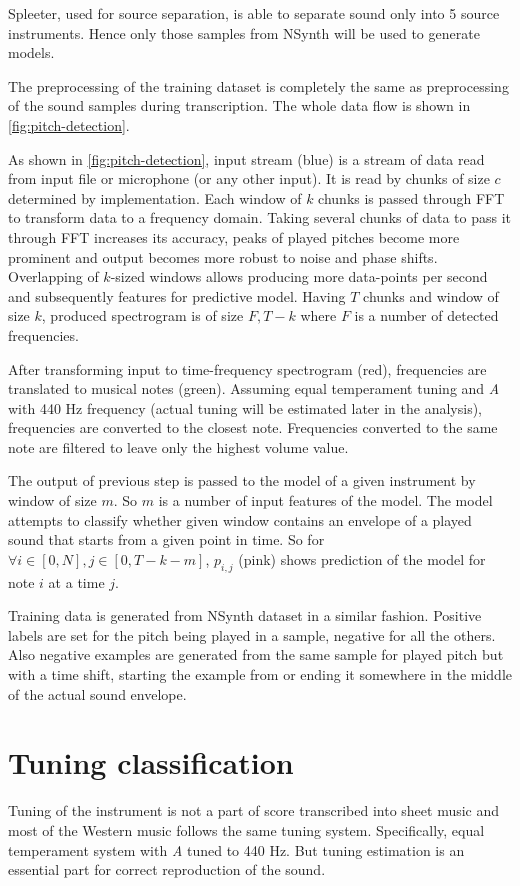 Spleeter, used for source separation, is able to separate sound only into 5 source instruments. Hence only those samples
from NSynth will be used to generate models.

The preprocessing of the training dataset is completely the same as preprocessing of the sound samples during
transcription. The whole data flow is shown in \cref{fig:pitch-detection}.


As shown in \cref{fig:pitch-detection}, input stream (blue) is a stream of data read from input file or microphone (or
any other input). It is read by chunks of size $c$ determined by implementation. Each window of $k$ chunks is passed
through \ac{FFT} to transform data to a frequency domain. Taking several chunks of data to pass it through \ac{FFT}
increases its accuracy, peaks of played pitches become more prominent and output becomes more robust to noise and phase
shifts. Overlapping of $k$-sized windows allows producing more data-points per second and subsequently features for
predictive model. Having $T$ chunks and window of size $k$, produced spectrogram is of size $F,T-k$ where $F$ is
a number of detected frequencies.

After transforming input to time-frequency spectrogram (red), frequencies are translated to musical notes (green).
Assuming equal temperament tuning and \textit{A} with 440 Hz frequency (actual tuning will be estimated later in
the analysis), frequencies are converted to the closest note. Frequencies converted to the same note are filtered
to leave only the highest volume value.

The output of previous step is passed to the model of a given instrument by window of size $m$. So $m$ is a number of
input features of the model. The model attempts to classify whether given window contains an envelope of a played sound
that starts from a given point in time. So for $\forall{i} \in [0,N], j \in [0,T-k-m]$, $p_{i,j}$ (pink) shows
prediction of the model for note $i$ at a time $j$.

Training data is generated from NSynth dataset in a similar fashion. Positive labels are set for the pitch being played
in a sample, negative for all the others. Also negative examples are generated from the same sample for played pitch but
with a time shift, starting the example from or ending it somewhere in the middle of the actual sound envelope.


\section{Tuning classification}\label{sec:tunning-classification}
Tuning of the instrument is not a part of score transcribed into sheet music and most of the Western music follows
the same tuning system. Specifically, equal temperament system with \textit{A} tuned to 440 Hz. But tuning estimation is
an essential part for correct reproduction of the sound.

